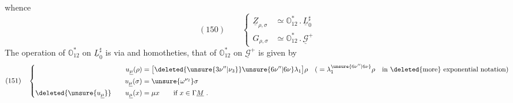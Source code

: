 whence
\[
(150)\qquad
\left\{\begin{aligned}
\underline Z_{\rho,\sigma}&\simeq\mathbb O_{12}^{*}\mathbin{.}\underline L_0^{\sharp}\\
G_{\rho,\sigma}&\simeq\mathbb O_{12}^{*}\mathbin{.}\underline{\mathcal G}^{+}
\end{aligned}\right.
\]
The operation of \(\mathbb O_{12}^{*}\) on \(\underline L_0^{\sharp}\) is
via
and homotheties, that
of \(\mathbb O_{12}^{*}\) on \(\underline{\mathcal G}^{+}\) is given by
\[
(151)\quad
\left\{\begin{aligned}
u_{\underline\mu}(\rho)&=\bigl[\deleted{\unsure{3\nu''|\nu_3}}\unsure{6\nu''|6\nu}\lambda_1\bigr]\rho
\quad\text{(}=\lambda_1^{\unsure{6\nu''|6\nu}}\rho\quad\text{in \deleted{more} exponential notation}\text{)}\\
u_{\underline\mu}(\sigma)&=\unsure{\omega^{\nu_2}}\sigma\\
\deleted{\unsure{u_{\underline\mu}}}\qquad u_{\underline\mu}(x)&=\mu x\qquad\text{if }x\in\Gamma\underline M\ .
\end{aligned}\right.
\]
